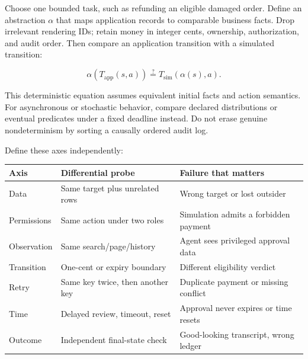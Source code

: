 \documentclass[
  11pt,
  letterpaper,
]{article}
\newcounter{none} %
\begin{document}
Choose one bounded task, such as refunding an eligible damaged order.
Define an abstraction \(\alpha\) that maps application records to
comparable business facts. Drop irrelevant rendering IDs; retain money
in integer cents, ownership, authorization, and audit order. Then
compare an application transition with a simulated transition:

\[\alpha(T_{\mathrm{app}}(s,a))\stackrel{?}{=}T_{\mathrm{sim}}(\alpha(s),a).\]

This deterministic equation assumes equivalent initial facts and action
semantics. For asynchronous or stochastic behavior, compare declared
distributions or eventual predicates under a fixed deadline instead. Do
not erase genuine nondeterminism by sorting a causally ordered audit
log.

Define these axes independently:

{\def\LTcaptype{none} %
\begin{longtable}[]{@{}
  >{\raggedright\arraybackslash}p{}
  >{\raggedright\arraybackslash}p{}
  >{\raggedright\arraybackslash}p{}@{}}
\toprule\noalign{}
\begin{minipage}[b]{\linewidth}\raggedright
Axis
\end{minipage} & \begin{minipage}[b]{\linewidth}\raggedright
Differential probe
\end{minipage} & \begin{minipage}[b]{\linewidth}\raggedright
Failure that matters
\end{minipage} \\
\midrule\noalign{}
\endhead
\bottomrule\noalign{}
\endlastfoot
Data & Same target plus unrelated rows & Wrong target or lost
outsider \\
Permissions & Same action under two roles & Simulation admits a
forbidden payment \\
Observation & Same search/page/history & Agent sees privileged approval
data \\
Transition & One-cent or expiry boundary & Different eligibility
verdict \\
Retry & Same key twice, then another key & Duplicate payment or missing
conflict \\
Time & Delayed review, timeout, reset & Approval never expires or time
resets \\
Outcome & Independent final-state check & Good-looking transcript, wrong
ledger \\
\end{longtable}
}
\end{document}
